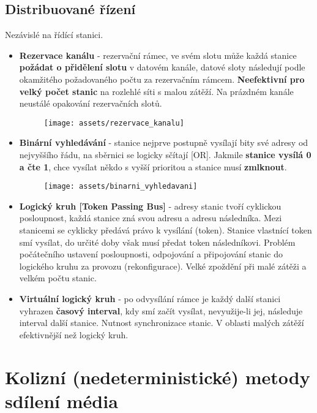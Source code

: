 \subsection{Distribuované řízení}
Nezávislé na řídící stanici.
\begin{itemize}
    \item \textbf{Rezervace kanálu} - rezervační rámec, ve svém slotu může každá stanice \textbf{požádat o přidělení slotu} v datovém kanále, datové sloty následují podle okamžitého požadovaného počtu za rezervačním rámcem. \textbf{Neefektivní pro velký počet stanic} na rozlehlé síti s malou zátěží. Na prázdném kanále neustálé opakování rezervačních slotů.
          \begin{figure}[H]
              \centering
              \texttt{[image: assets/rezervace\_kanalu]}
          \end{figure}
    \item \textbf{Binární vyhledávání} -  stanice nejprve postupně vysílají bity své adresy od nejvyššího řádu, na sběrnici se logicky sčítají [OR]. Jakmile \textbf{stanice vysílá 0 a čte 1}, chce vysílat někdo s vyšší prioritou a stanice musí \textbf{zmlknout}.
          \begin{figure}[H]
              \centering
              \texttt{[image: assets/binarni\_vyhledavani]}
          \end{figure}
    \item \textbf{Logický kruh [Token Passing Bus]} - adresy stanic tvoří cyklickou posloupnost, každá stanice zná svou adresu a adresu následníka. Mezi stanicemi se cyklicky předává právo k vysílání (token). Stanice vlastnící token smí vysílat, do určité doby však musí předat token následníkovi. Problém počátečního ustavení posloupnosti, odpojování a připojování stanic do logického kruhu za provozu (rekonfigurace). Velké zpoždění při malé zátěži a velkém počtu stanic.
    \item \textbf{Virtuální logický kruh} - po odvysílání rámce je každý další stanici vyhrazen \textbf{časový interval}, kdy smí začít vysílat, nevyužije-li jej, následuje interval další stanice. Nutnost synchronizace stanic. V oblasti malých zátěží efektivnější než logický kruh.
\end{itemize}

\section{Kolizní (nedeterministické) metody sdílení média}
